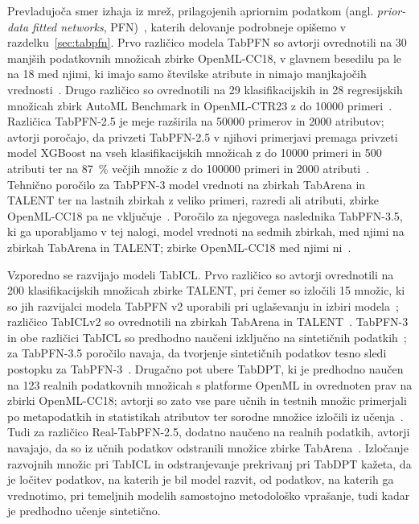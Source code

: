 \documentclass[a4paper,12pt,openright]{book}
\begin{document}
Prevladujoča smer izhaja iz mrež, prilagojenih apriornim podatkom (angl.
\emph{prior-data fitted networks}, PFN)~\cite{muller2022transformers}, katerih
delovanje podrobneje opišemo v razdelku~\ref{sec:tabpfn}. Prvo različico
modela TabPFN so avtorji ovrednotili na 30 manjših podatkovnih množicah zbirke
OpenML-CC18, v glavnem besedilu pa le na 18 med njimi, ki imajo samo številske
atribute in nimajo manjkajočih vrednosti~\cite{hollmann2023tabpfn}. Drugo
različico so ovrednotili na 29 klasifikacijskih in 28 regresijskih množicah
zbirk AutoML Benchmark in OpenML-CTR23 z do \num{10000}
primeri~\cite{hollmann2025tabpfn}. Različica TabPFN-2.5 je meje razširila na
\num{50000} primerov in 2000 atributov; avtorji poročajo, da privzeti
TabPFN-2.5 v njihovi primerjavi premaga privzeti model XGBoost na vseh
klasifikacijskih množicah z do \num{10000} primeri in 500 atributi ter na
\SI{87}{\percent} večjih množic z do \num{100000} primeri in 2000
atributi~\cite{grinsztajn2025tabpfn25}. Tehnično poročilo za TabPFN-3 model
vrednoti na zbirkah TabArena in TALENT ter na lastnih zbirkah z veliko
primeri, razredi ali atributi, zbirke OpenML-CC18 pa ne
vključuje~\cite{grinsztajn2026tabpfn3}. Poročilo za njegovega naslednika
TabPFN-3.5, ki ga uporabljamo v tej nalogi, model vrednoti na sedmih zbirkah,
med njimi na zbirkah TabArena in TALENT; zbirke OpenML-CC18 med njimi
ni~\cite{jager2026tabpfn35}.

Vzporedno se razvijajo modeli TabICL. Prvo različico so avtorji ovrednotili na
200 klasifikacijskih množicah zbirke TALENT, pri čemer so izločili 15 množic,
ki so jih razvijalci modela TabPFN v2 uporabili pri uglaševanju in izbiri
modela~\cite{qu2025tabicl}; različico TabICLv2 so ovrednotili na zbirkah
TabArena in TALENT~\cite{qu2026tabiclv2}. TabPFN-3 in obe različici TabICL so
predhodno naučeni izključno na sintetičnih
podatkih~\cite{grinsztajn2026tabpfn3,qu2025tabicl,qu2026tabiclv2}; za TabPFN-3.5
poročilo navaja, da tvorjenje sintetičnih podatkov tesno sledi postopku za
TabPFN-3~\cite{jager2026tabpfn35}. Drugačno
pot ubere TabDPT, ki je predhodno naučen na 123 realnih podatkovnih množicah s
platforme OpenML in ovrednoten prav na zbirki OpenML-CC18; avtorji so zato vse
pare učnih in testnih množic primerjali po metapodatkih in statistikah
atributov ter sorodne množice izločili iz učenja~\cite{ma2025tabdpt}. Tudi za
različico Real-TabPFN-2.5, dodatno naučeno na realnih podatkih, avtorji
navajajo, da so iz učnih podatkov odstranili množice zbirke
TabArena~\cite{grinsztajn2025tabpfn25}. Izločanje razvojnih množic pri TabICL
in odstranjevanje prekrivanj pri TabDPT kažeta, da je ločitev podatkov, na
katerih je bil model razvit, od podatkov, na katerih ga vrednotimo, pri
temeljnih modelih samostojno metodološko vprašanje, tudi kadar je predhodno
učenje sintetično.
\end{document}
